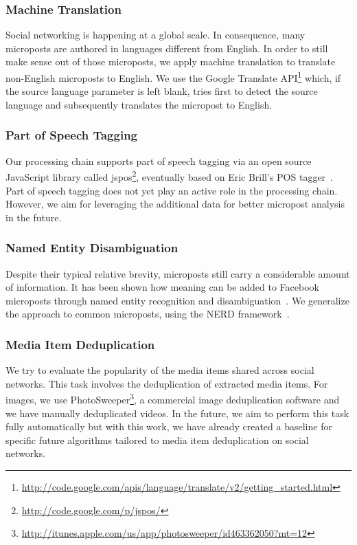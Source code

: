 \subsubsection{Machine Translation}
Social networking is happening at a global scale. In consequence, many microposts are authored in languages different from English. In order to still make sense out of those microposts, we apply machine translation to translate non-English microposts to English. We use the Google Translate API\footnote{\url{http://code.google.com/apis/language/translate/v2/getting_started.html}} which, if the source language parameter is left blank, tries first to detect the source language and subsequently translates the micropost to English.

\subsubsection{Part of Speech Tagging}
Our processing chain supports part of speech tagging via an open source JavaScript library called jspos\footnote{\url{http://code.google.com/p/jspos/}},
eventually based on Eric Brill's POS tagger~\cite{brill1992simple}. Part of speech tagging does not yet play an active role in the processing chain. However,
we aim for leveraging the additional data for better micropost analysis in the future.

\subsubsection{Named Entity Disambiguation}
Despite their typical relative brevity, microposts still carry a considerable amount of information. It has been shown how meaning can be added to Facebook microposts through named entity recognition and disambiguation~\cite{AddingMeaningToMicroposts}. We generalize the approach to common microposts,
using the NERD framework~\cite{NERD}.

\subsubsection{Media Item Deduplication}
We try to evaluate the popularity of the media items shared across social networks. This task involves the deduplication of extracted media items.
For images, we use PhotoSweeper\footnote{\url{http://itunes.apple.com/us/app/photosweeper/id463362050?mt=12}}, a commercial image deduplication software and we have manually deduplicated videos. In the future, we aim to perform this task fully automatically but with this work, we have already created a baseline for specific future algorithms tailored to media item deduplication on social networks.

